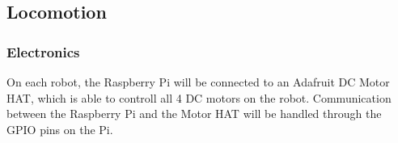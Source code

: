 
\subsection{Locomotion}
\label{sec:hardware_locomotion}

\subsubsection{Electronics}
\label{sec:locomotion_electronics}
On each robot, the Raspberry Pi will be connected to an Adafruit DC Motor HAT, which is able to controll all 4 DC motors on the robot. Communication between the Raspberry Pi and the Motor HAT will be handled through the GPIO pins on the Pi. 